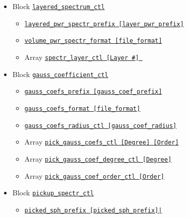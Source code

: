 \begin{itemize}
\begin{itemize}
\begin{itemize}
\begin{itemize}
		    	{\tt volume\_pwr\_spectr\_format    [file\_format]}
%
			\item \hyperref[href_t:inner_radius_ctl]
				{\tt inner\_radius\_ctl           [radius]}
			\item \hyperref[href_t:outer_radius_ctl]
				{\tt outer\_radius\_ctl           [radius]}
			\end{itemize}
		\end{itemize}
%
	\item Block \hyperref[href_t:layered_spectrum_ctl]{\tt layered\_spectrum\_ctl}
		\begin{itemize}
		\item \hyperref[href_t:layered_pwr_spectr_prefix]
				{\tt layered\_pwr\_spectr\_prefix         [layer\_pwr\_prefix]}
       	\item \hyperref[href_t:layered_pwr_spectr_format]
		    	{\tt volume\_pwr\_spectr\_format    [file\_format]}
		\item Array \hyperref[href_t:spectr_layer_ctl]
				{\tt spectr\_layer\_ctl [Layer \#] }
		\end{itemize}
%
	\item Block \hyperref[href_t:gauss_coefficient_ctl]{\tt gauss\_coefficient\_ctl}
		\begin{itemize}
		\item \hyperref[href_t:gauss_coefs_prefix]
			{\tt gauss\_coefs\_prefix                [gauss\_coef\_prefix]}
       	\item \hyperref[href_t:gauss_coefs_format]
		    	{\tt gauss\_coefs\_format    [file\_format]}
		\item \hyperref[href_t:gauss_coefs_radius_ctl]
            {\tt gauss\_coefs\_radius\_ctl           [gauss\_coef\_radius]}
			\item Array \hyperref[href_t:pick_gauss_coefs_ctl]
                		{\tt pick\_gauss\_coefs\_ctl  [Degree]   [Order]}
		\item Array \hyperref[href_t:pick_gauss_coef_degree_ctl]
                    {\tt pick\_gauss\_coef\_degree\_ctl  [Degree]}
		\item Array \hyperref[href_t:pick_gauss_coef_order_ctl]
					{\tt pick\_gauss\_coef\_order\_ctl   [Order]}
		\end{itemize}
%
	\item Block \hyperref[href_t:pickup_spectr_ctl]{\tt pickup\_spectr\_ctl}
		\begin{itemize}
		\item \hyperref[href_t:picked_sph_prefix]
			{\tt picked\_sph\_prefix                    [picked\_sph\_prefix]|}

\end{itemize}
\end{itemize}
\end{itemize}
